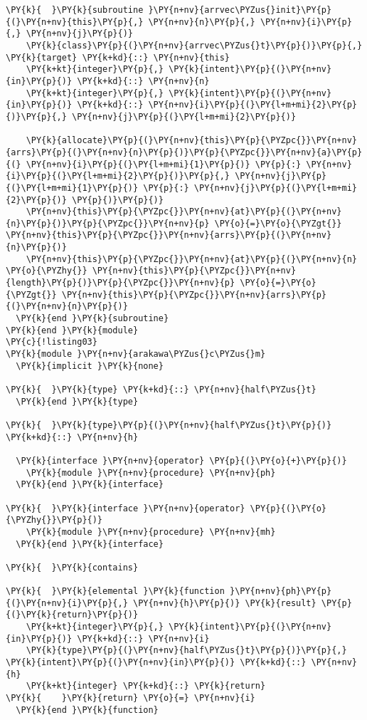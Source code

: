 \begin{Verbatim}[commandchars=\\\{\}]
\PY{k}{  }\PY{k}{subroutine }\PY{n+nv}{arrvec\PYZus{}init}\PY{p}{(}\PY{n+nv}{this}\PY{p}{,} \PY{n+nv}{n}\PY{p}{,} \PY{n+nv}{i}\PY{p}{,} \PY{n+nv}{j}\PY{p}{)}
    \PY{k}{class}\PY{p}{(}\PY{n+nv}{arrvec\PYZus{}t}\PY{p}{)}\PY{p}{,} \PY{k}{target} \PY{k+kd}{::} \PY{n+nv}{this}
    \PY{k+kt}{integer}\PY{p}{,} \PY{k}{intent}\PY{p}{(}\PY{n+nv}{in}\PY{p}{)} \PY{k+kd}{::} \PY{n+nv}{n}
    \PY{k+kt}{integer}\PY{p}{,} \PY{k}{intent}\PY{p}{(}\PY{n+nv}{in}\PY{p}{)} \PY{k+kd}{::} \PY{n+nv}{i}\PY{p}{(}\PY{l+m+mi}{2}\PY{p}{)}\PY{p}{,} \PY{n+nv}{j}\PY{p}{(}\PY{l+m+mi}{2}\PY{p}{)}

    \PY{k}{allocate}\PY{p}{(}\PY{n+nv}{this}\PY{p}{\PYZpc{}}\PY{n+nv}{arrs}\PY{p}{(}\PY{n+nv}{n}\PY{p}{)}\PY{p}{\PYZpc{}}\PY{n+nv}{a}\PY{p}{(} \PY{n+nv}{i}\PY{p}{(}\PY{l+m+mi}{1}\PY{p}{)} \PY{p}{:} \PY{n+nv}{i}\PY{p}{(}\PY{l+m+mi}{2}\PY{p}{)}\PY{p}{,} \PY{n+nv}{j}\PY{p}{(}\PY{l+m+mi}{1}\PY{p}{)} \PY{p}{:} \PY{n+nv}{j}\PY{p}{(}\PY{l+m+mi}{2}\PY{p}{)} \PY{p}{)}\PY{p}{)}
    \PY{n+nv}{this}\PY{p}{\PYZpc{}}\PY{n+nv}{at}\PY{p}{(}\PY{n+nv}{n}\PY{p}{)}\PY{p}{\PYZpc{}}\PY{n+nv}{p} \PY{o}{=}\PY{o}{\PYZgt{}} \PY{n+nv}{this}\PY{p}{\PYZpc{}}\PY{n+nv}{arrs}\PY{p}{(}\PY{n+nv}{n}\PY{p}{)}
    \PY{n+nv}{this}\PY{p}{\PYZpc{}}\PY{n+nv}{at}\PY{p}{(}\PY{n+nv}{n} \PY{o}{\PYZhy{}} \PY{n+nv}{this}\PY{p}{\PYZpc{}}\PY{n+nv}{length}\PY{p}{)}\PY{p}{\PYZpc{}}\PY{n+nv}{p} \PY{o}{=}\PY{o}{\PYZgt{}} \PY{n+nv}{this}\PY{p}{\PYZpc{}}\PY{n+nv}{arrs}\PY{p}{(}\PY{n+nv}{n}\PY{p}{)}
  \PY{k}{end }\PY{k}{subroutine}
\PY{k}{end }\PY{k}{module}
\PY{c}{!listing03}
\PY{k}{module }\PY{n+nv}{arakawa\PYZus{}c\PYZus{}m}
  \PY{k}{implicit }\PY{k}{none}

\PY{k}{  }\PY{k}{type} \PY{k+kd}{::} \PY{n+nv}{half\PYZus{}t}
  \PY{k}{end }\PY{k}{type}

\PY{k}{  }\PY{k}{type}\PY{p}{(}\PY{n+nv}{half\PYZus{}t}\PY{p}{)} \PY{k+kd}{::} \PY{n+nv}{h}

  \PY{k}{interface }\PY{n+nv}{operator} \PY{p}{(}\PY{o}{+}\PY{p}{)}
    \PY{k}{module }\PY{n+nv}{procedure} \PY{n+nv}{ph}
  \PY{k}{end }\PY{k}{interface}

\PY{k}{  }\PY{k}{interface }\PY{n+nv}{operator} \PY{p}{(}\PY{o}{\PYZhy{}}\PY{p}{)}
    \PY{k}{module }\PY{n+nv}{procedure} \PY{n+nv}{mh}
  \PY{k}{end }\PY{k}{interface}

\PY{k}{  }\PY{k}{contains}

\PY{k}{  }\PY{k}{elemental }\PY{k}{function }\PY{n+nv}{ph}\PY{p}{(}\PY{n+nv}{i}\PY{p}{,} \PY{n+nv}{h}\PY{p}{)} \PY{k}{result} \PY{p}{(}\PY{k}{return}\PY{p}{)}
    \PY{k+kt}{integer}\PY{p}{,} \PY{k}{intent}\PY{p}{(}\PY{n+nv}{in}\PY{p}{)} \PY{k+kd}{::} \PY{n+nv}{i}
    \PY{k}{type}\PY{p}{(}\PY{n+nv}{half\PYZus{}t}\PY{p}{)}\PY{p}{,} \PY{k}{intent}\PY{p}{(}\PY{n+nv}{in}\PY{p}{)} \PY{k+kd}{::} \PY{n+nv}{h}
    \PY{k+kt}{integer} \PY{k+kd}{::} \PY{k}{return}
\PY{k}{    }\PY{k}{return} \PY{o}{=} \PY{n+nv}{i} 
  \PY{k}{end }\PY{k}{function}


\end{Verbatim}
